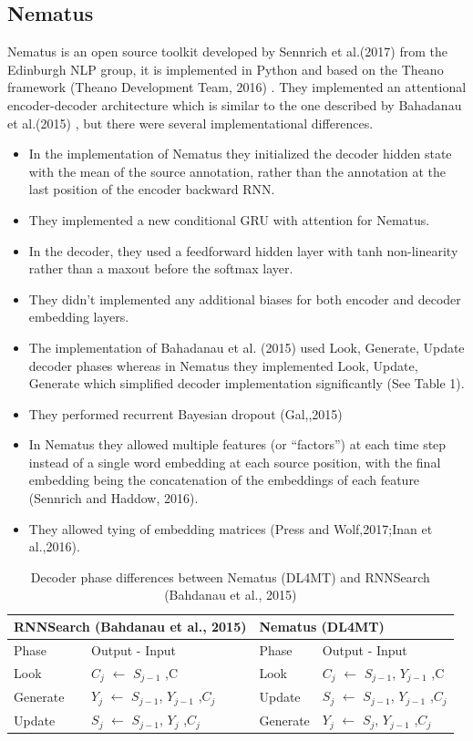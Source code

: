 \subsection{Nematus}

Nematus is an open source toolkit developed by Sennrich et al.(2017) from the Edinburgh NLP group, it is implemented in Python and based on the Theano framework (Theano Development Team, 2016) . They implemented an attentional encoder-decoder architecture which is similar to the one described by Bahadanau et al.(2015) , but there were several implementational differences.
\begin{itemize}
\item In the implementation of Nematus they initialized the decoder hidden state with the mean of the source annotation, rather than the annotation at the last position of the encoder backward RNN. 
\item They implemented a new conditional GRU with attention for Nematus.
\item In the decoder, they used a feedforward hidden layer with tanh non-linearity rather than a maxout before the softmax layer.
\item They didn’t implemented any additional biases for both encoder and decoder embedding layers.
\item The implementation of Bahadanau et al. (2015) used Look, Generate, Update decoder phases whereas in Nematus they implemented Look, Update, Generate which simplified decoder implementation significantly (See Table 1). 
\item They performed recurrent Bayesian dropout (Gal,,2015)
\item In Nematus they allowed multiple features (or “factors”) at each time step instead of a single word embedding at each source position, with the final embedding being the concatenation of the embeddings of each feature (Sennrich and Haddow, 2016).
\item They allowed tying of embedding matrices (Press and Wolf,2017;Inan et al.,2016).
\end{itemize}

\begin{table}[h!]
\centering
 \begin{tabular}{ |ll|ll|} 
 \hline
 \multicolumn{2}{|l|}{RNNSearch (Bahdanau et al., 2015)} & \multicolumn{2}{l|}{Nematus (DL4MT)}\\
  \hline  Phase & Output - Input & Phase & Output - Input \\
  \hline Look & $C_j$ $\leftarrow$ $S_{j-1}$ ,C & Look & $C_j$ $\leftarrow$ $S_{j-1}$, $Y_{j-1}$ ,C \\
  Generate & $Y_j$ $\leftarrow$ $S_{j-1}$, $Y_{j-1}$ ,$C_j$ & Update& $S_j$ $\leftarrow$ $S_{j-1}$, $Y_{j-1}$ ,$C_j$ \\
  Update & $S_j$ $\leftarrow$ $S_{j-1}$, $Y_{j}$ ,$C_j$ & Generate& $Y_j$ $\leftarrow$ $S_{j}$, $Y_{j-1}$ ,$C_j$ \\
  \hline
 \end{tabular}

\caption{Decoder phase differences between Nematus (DL4MT) and RNNSearch (Bahdanau et al., 2015)}
\end{table}

